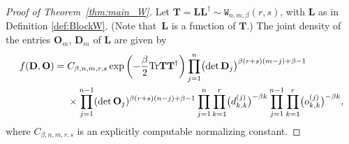 \documentclass[pdftex]{sigma}
\numberwithin{equation}{section}
\theoremstyle{definition}
\newcommand{\Tr}{\textup{Tr}}
\newcommand{\T}{\dag}
\newcommand{\mbf}[1]{\mathbf{#1}}
\newcommand{\WW}{\mathtt{W}_{n,m, \beta}}
\begin{document}
\begin{proof}[Proof of Theorem~\ref{thm:main_W}]
Let $\mbf{T}=\mbf{L}\mbf{L}^{\T}\sim \WW(r,s)$, with $\mbf{L}$ as in Definition \ref{def:BlockW}. (Note that~$\mbf{L}$ is a function of $\mbf{T}$.) The joint density of the entries $\mbf{O}_m$, $\mbf{D}_m$ of $\mbf{L}$ are given by
\begin{align*}
 f(\mbf{D}, \mbf{O})={}&C_{\beta, n,m,r,s} \exp\left(-\frac{\beta}{2}\Tr \mbf{T} \mbf{T}^{\T}\right)\prod_{j=1}^n \bigl(\det \mbf{D}_j\bigr)^{\beta (r+s)(m-j)+\beta-1} \\
 & \times \prod_{j=1}^{n-1} (\det \mbf{O}_j)^{\beta (r+s)(n-j)+\beta-1}\prod_{j=1}^n \prod_{k=1}^r \bigl(d^{(j)}_{k, k}\bigr)^{-\beta k} \prod_{j=1}^{n-1} \prod_{k=1}^r \bigl(o^{(j)}_{k, k}\bigr)^{-\beta k},
\end{align*}
where $C_{\beta,n,m,r,s}$ is an explicitly computable normalizing constant.


\end{proof}
\end{document}
